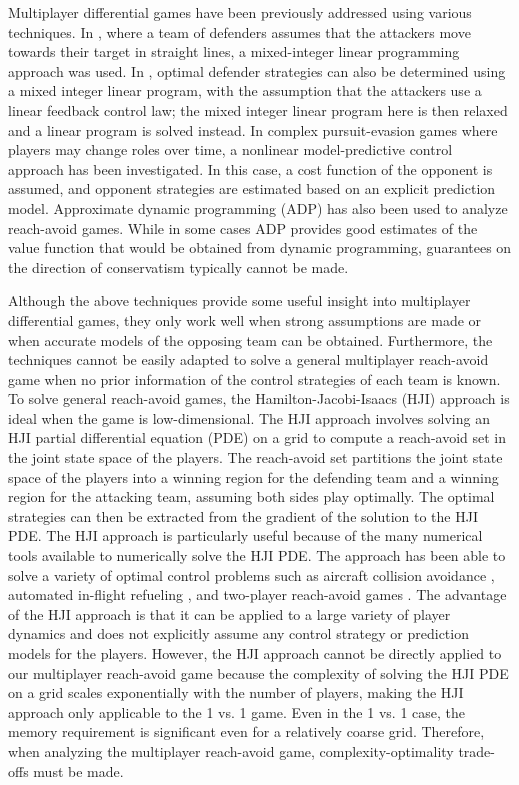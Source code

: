 Multiplayer differential games have been previously addressed using various techniques. In \cite{Earl:2007p101}, where a team of defenders assumes that the attackers move towards their target in straight lines, a mixed-integer linear programming approach was used. In \cite{Chasparis:2005p102}, optimal defender strategies can also be determined using a mixed integer linear program, with the assumption that the attackers use a linear feedback control law; the mixed integer linear program here is then relaxed and a linear program is solved instead. In complex pursuit-evasion games where players may change roles over time, a nonlinear model-predictive control \cite{Sprinkle:2004p100} approach has been investigated. In this case, a cost function of the opponent is assumed, and opponent strategies are estimated based on an explicit prediction model. Approximate dynamic programming (ADP) \cite{McGrew:2008p103} has also been used to analyze reach-avoid games. While in some cases ADP provides good estimates of the value function that would be obtained from dynamic programming, guarantees on the direction of conservatism typically cannot be made.

Although the above techniques provide some useful insight into multiplayer differential games, they only work well when strong assumptions are made or when accurate models of the opposing team can be obtained. Furthermore, the techniques cannot be easily adapted to solve a general multiplayer reach-avoid game when no prior information of the control strategies of each team is known. To solve general reach-avoid games, the Hamilton-Jacobi-Isaacs (HJI) approach \cite{b:isaacs-1967} is ideal when the game is low-dimensional. The HJI approach involves solving an HJI partial differential equation (PDE) on a grid to compute a reach-avoid set in the joint state space of the players. The reach-avoid set partitions the joint state space of the players into a winning region for the defending team and a winning region for the attacking team, assuming both sides play optimally. The optimal strategies can then be extracted from the gradient of the solution to the HJI PDE. The HJI approach is particularly useful because of the many numerical tools \cite{j:mitchell-TAC-2005, Sethian1996, b:osher-fedkiw-2002} available to numerically solve the HJI PDE. The approach has been able to solve a variety of optimal control problems such as aircraft collision avoidance \cite{j:mitchell-TAC-2005}, automated in-flight refueling \cite{DSST08}, and two-player reach-avoid games \cite{Huang2011}. The advantage of the HJI approach is that it can be applied to a large variety of player dynamics and does not explicitly assume any control strategy or prediction models for the players. However, the HJI approach cannot be directly applied to our multiplayer reach-avoid game because the complexity of solving the HJI PDE on a grid scales exponentially with the number of players, making the HJI approach only applicable to the 1 vs. 1 game. Even in the 1 vs. 1 case, the memory requirement is significant even for a relatively coarse grid. Therefore, when analyzing the multiplayer reach-avoid game, complexity-optimality trade-offs must be made.


